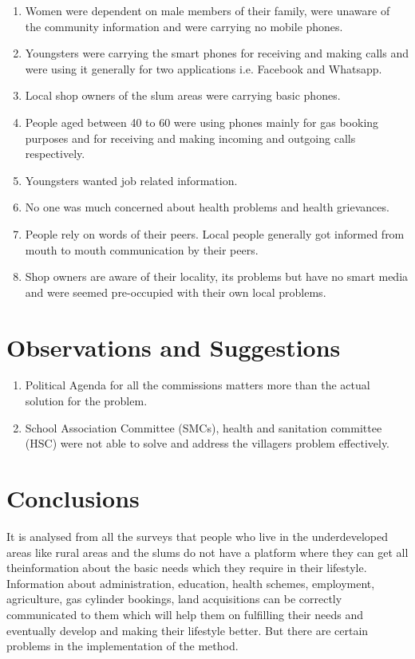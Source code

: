 \begin{enumerate}
\begin{enumerate}
\item  Women were dependent on male members of their family, were unaware of the community information and were carrying no mobile phones.
\item Youngsters were carrying the smart phones for receiving and making calls
and were using it generally for two applications i.e. Facebook and Whatsapp.
\item Local shop owners of the slum areas were carrying basic phones.
\item People aged between 40 to 60 were using phones mainly for gas booking
purposes and for receiving and making incoming and outgoing calls
respectively.
\item Youngsters wanted job related information.
\item No one was much concerned about health problems and health grievances.
\item People rely on words of their peers. Local people generally got informed from
mouth to mouth communication by their peers.
\item Shop owners are aware of their locality, its problems but have no smart
media and were seemed pre-occupied with their own local problems.
\end{enumerate}
\end{enumerate}

\section {Observations and Suggestions}

\begin{enumerate}
\item Political Agenda for all the commissions matters more than the actual solution for the problem.
\item School Association Committee (SMCs), health and sanitation committee (HSC) were not able to solve and address the villagers problem effectively.
\end{enumerate}

\section {Conclusions}
It is analysed from all the surveys that people who live in the underdeveloped areas
like rural areas and the slums do not have a platform where they can get all theinformation about the basic needs which they require in their lifestyle. Information
about administration, education, health schemes, employment, agriculture, gas
cylinder bookings, land acquisitions can be correctly communicated to them which
will help them on fulfilling their needs and eventually develop and making their
lifestyle better. But there are certain problems in the implementation of the
method.

